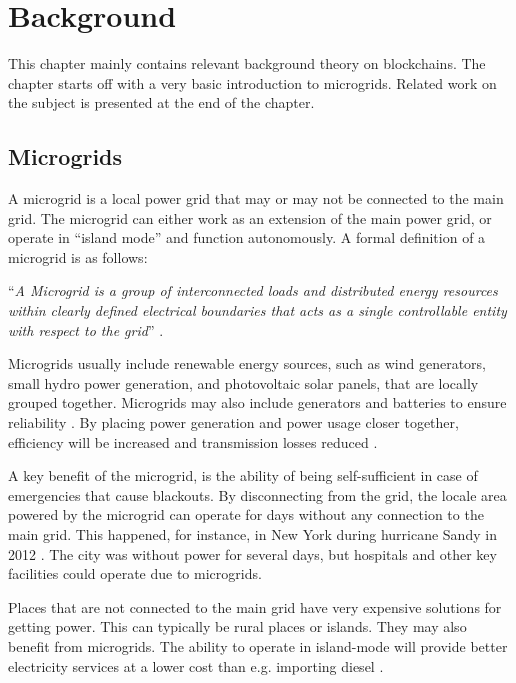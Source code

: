 \chapter{Background}
This chapter mainly contains relevant background theory on blockchains. The chapter starts off with a very basic introduction to microgrids. Related work on the subject is presented at the end of the chapter. 

\section{Microgrids}
A microgrid is a local power grid that may or may not be connected to the main grid. The microgrid can either work as an extension of the main power grid, or operate in \enquote{island mode} and function autonomously. A formal definition of a microgrid is as follows: 

\enquote{\textit{A Microgrid is a group of interconnected loads and distributed energy resources within clearly defined electrical boundaries that acts as a single controllable entity with respect to the grid}} \cite{micro_securicon}.

Microgrids usually include renewable energy sources, such as wind generators, small hydro power generation, and photovoltaic solar panels, that are locally grouped together. Microgrids may also include generators and batteries to ensure reliability \cite{general_microgrid}. By placing power generation and power usage closer together, efficiency will be increased and transmission losses reduced \cite{Microgrid_konashevych}. 

A key benefit of the microgrid, is the ability of being self-sufficient in case of emergencies that cause blackouts. By disconnecting from the grid, the locale area powered by the microgrid can operate for days without any connection to the main grid. This happened, for instance, in New York during hurricane Sandy in 2012 \cite{sandy}. The city was without power for several days, but hospitals and other key facilities could operate due to microgrids. 

Places that are not connected to the main grid have very expensive solutions for getting power. This can typically be rural places or islands. They may also benefit from microgrids. The ability to operate in island-mode will provide better electricity services at a lower cost than e.g. importing diesel \cite{abb}.


